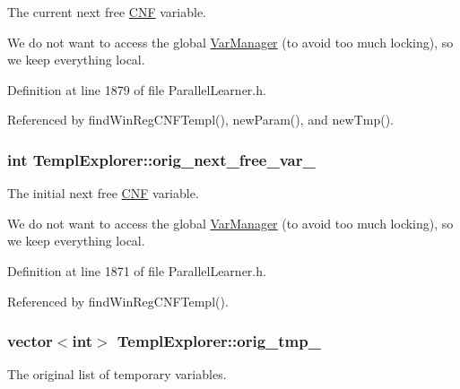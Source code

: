 The current next free \hyperlink{classCNF}{C\-N\-F} variable. 

We do not want to access the global \hyperlink{classVarManager}{Var\-Manager} (to avoid too much locking), so we keep everything local. 

Definition at line 1879 of file Parallel\-Learner.\-h.



Referenced by find\-Win\-Reg\-C\-N\-F\-Templ(), new\-Param(), and new\-Tmp().

\hypertarget{classTemplExplorer_a3561a52c7e33d2b49d09fab789824464}{
\subsubsection[{orig\-\_\-next\-\_\-free\-\_\-var\-\_\-}]{\setlength{\rightskip}{0pt plus 5cm}int Templ\-Explorer\-::orig\-\_\-next\-\_\-free\-\_\-var\-\_\-\hspace{0.3cm}{\ttfamily [protected]}}}\label{classTemplExplorer_a3561a52c7e33d2b49d09fab789824464}


The initial next free \hyperlink{classCNF}{C\-N\-F} variable. 

We do not want to access the global \hyperlink{classVarManager}{Var\-Manager} (to avoid too much locking), so we keep everything local. 

Definition at line 1871 of file Parallel\-Learner.\-h.



Referenced by find\-Win\-Reg\-C\-N\-F\-Templ().

\hypertarget{classTemplExplorer_a78b116eb73648638c926f22f6a7a74fc}{
\subsubsection[{orig\-\_\-tmp\-\_\-}]{\setlength{\rightskip}{0pt plus 5cm}vector$<$int$>$ Templ\-Explorer\-::orig\-\_\-tmp\-\_\-\hspace{0.3cm}{\ttfamily [protected]}}}\label{classTemplExplorer_a78b116eb73648638c926f22f6a7a74fc}


The original list of temporary variables. 


